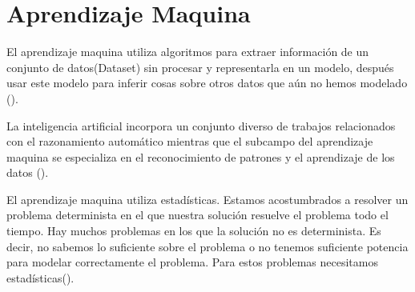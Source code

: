 \section{Aprendizaje Maquina}

El aprendizaje maquina utiliza algoritmos para extraer información de un conjunto de datos(Dataset) sin procesar y representarla en un modelo, después usar este modelo para inferir cosas sobre otros datos que aún no hemos modelado (\cite{patterson2017deep}).

La inteligencia artificial incorpora un conjunto diverso de trabajos relacionados con el razonamiento automático mientras que el subcampo del aprendizaje maquina se especializa en el reconocimiento de patrones y el aprendizaje de los datos (\cite{rosebrock2017deep}).

El aprendizaje maquina utiliza estadísticas. Estamos acostumbrados a resolver un problema determinista en el que nuestra solución resuelve el problema todo el tiempo. Hay muchos problemas en los que la solución no es determinista. Es decir, no sabemos lo suficiente sobre el problema o no tenemos suficiente potencia para modelar correctamente el problema. Para estos problemas necesitamos estadísticas(\cite{harrington2012Machine}).
